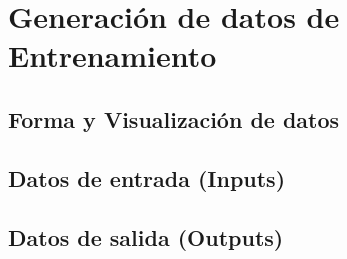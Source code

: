 \chapter{Generación de datos de Entrenamiento}\label{ch:GenData}
\section{Forma y Visualización de datos}

\section{Datos de entrada (Inputs)}

\section{Datos de salida (Outputs)}

